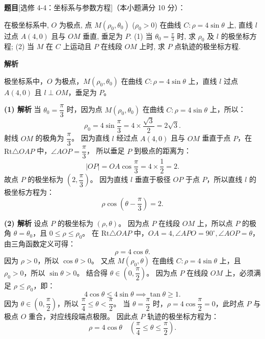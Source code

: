 \begin{answer}


\par\medskip

\end{answer}
\begin{answer}

\textbf{题目}[选修 4-4：坐标系与参数方程]（本小题满分 10 分）：

在极坐标系中, $O$ 为极点, 点 $M(\rho_0, \theta_0)$ ($\rho_0 > 0$) 在曲线 $C: \rho = 4\sin\theta$ 上, 直线 $l$ 过点 $A(4, 0)$ 且与 $OM$ 垂直, 垂足为 $P$.
(1) 当 $\theta_0 = \frac{\pi}{3}$ 时, 求 $\rho_0$ 及 $l$ 的极坐标方程;
(2) 当 $M$ 在 $C$ 上运动且 $P$ 在线段 $OM$ 上时, 求 $P$ 点轨迹的极坐标方程.

\textbf{解析}

极坐标系中，$O$ 为极点，$M(\rho_0, \theta_0)$ 在曲线 $C: \rho = 4\sin\theta$ 上，直线 $l$ 过点 $A(4, 0)$ 且 $l \perp OM$，垂足为 $P$。

\textbf{(1) 解析}
当 $\theta_0 = \dfrac{\pi}{3}$ 时，因为点 $M(\rho_0, \theta_0)$ 在曲线 $C: \rho = 4\sin\theta$ 上，所以：
\nopagebreak[4]
\[\rho_0 = 4\sin\frac{\pi}{3} = 4 \times \frac{\sqrt{3}}{2} = 2\sqrt{3}.\]
射线 $OM$ 的极角为 $\dfrac{\pi}{3}$。
因为直线 $l$ 经过点 $A(4, 0)$ 且与 $OM$ 垂直于点 $P$，在 $\text{Rt}\triangle OAP$ 中，$\angle AOP = \dfrac{\pi}{3}$，
所以垂足 $P$ 到极点的距离为：
\nopagebreak[4]
\[|OP| = OA\cos\frac{\pi}{3} = 4 \times \frac{1}{2} = 2.\]
故点 $P$ 的极坐标为 $(2, \dfrac{\pi}{3})$。
因为直线 $l$ 垂直于极径 $OP$ 于点 $P$，所以直线 $l$ 的极坐标方程为：
\nopagebreak[4]
\[\rho\cos\left(\theta - \frac{\pi}{3}\right) = 2.\]

\textbf{(2) 解析}
设点 $P$ 的极坐标为 $(\rho, \theta)$。
因为点 $P$ 在线段 $OM$ 上，所以点 $P$ 的极角 $\theta = \theta_0$，且 $0 \leqslant \rho \leqslant \rho_0$。
在 $\text{Rt}\triangle OAP$ 中，$OA = 4, \angle APO = 90^\circ, \angle AOP = \theta$，
由三角函数定义可得：
\nopagebreak[4]
\[\rho = 4\cos\theta.\]
因为 $\rho > 0$，所以 $\cos\theta > 0$。
又点 $M(\rho_0, \theta)$ 在曲线 $C: \rho = 4\sin\theta$ 上，且 $\rho_0 > 0$，所以 $\sin\theta > 0$。
结合得 $\theta \in (0, \dfrac{\pi}{2})$。
因为点 $P$ 在线段 $OM$ 上，必须满足 $\rho \leqslant \rho_0$，即：
\nopagebreak[4]
\[4\cos\theta \leqslant 4\sin\theta \implies \tan\theta \geqslant 1.\]
因为 $\theta \in (0, \dfrac{\pi}{2})$，所以 $\dfrac{\pi}{4} \leqslant \theta < \dfrac{\pi}{2}$。
当 $\theta = \dfrac{\pi}{2}$ 时，$\rho = 4\cos\dfrac{\pi}{2} = 0$，此时点 $P$ 与极点 $O$ 重合，对应线段端点极限。
因此点 $P$ 轨迹的极坐标方程为：
\nopagebreak[4]
\[\rho = 4\cos\theta \quad \left(\frac{\pi}{4} \leqslant \theta \leqslant \frac{\pi}{2}\right).\]



\end{answer}
